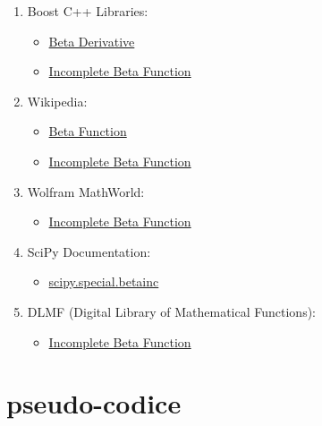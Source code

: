 \documentclass{article}
\begin{document}
\begin{enumerate}
  \item Boost C++ Libraries:
    \begin{itemize}
      \item \href{https://www.boost.org/doc/libs/1_84_0/libs/math/doc/html/math_toolkit/sf_beta/beta_derivative.html}{Beta Derivative}
      \item \href{https://www.boost.org/doc/libs/1_84_0/libs/math/doc/html/math_toolkit/sf_beta/ibeta_function.html}{Incomplete Beta Function}
    \end{itemize}
  
  \item Wikipedia:
    \begin{itemize}
      \item \href{https://en.wikipedia.org/wiki/Beta_function}{Beta Function}
      \item \href{https://en.wikipedia.org/wiki/Incomplete_beta_function}{Incomplete Beta Function}
    \end{itemize}
  
  \item Wolfram MathWorld:
    \begin{itemize}
      \item \href{https://mathworld.wolfram.com/IncompleteBetaFunction.html}{Incomplete Beta Function}
    \end{itemize}
  
  \item SciPy Documentation:
    \begin{itemize}
      \item \href{https://docs.scipy.org/doc/scipy/reference/generated/scipy.special.betainc.html}{scipy.special.betainc}
    \end{itemize}
  
  \item DLMF (Digital Library of Mathematical Functions):
    \begin{itemize}
      \item \href{https://dlmf.nist.gov/8.17}{Incomplete Beta Function}
    \end{itemize}
\end{enumerate}

\section{pseudo-codice}
\end{document}
